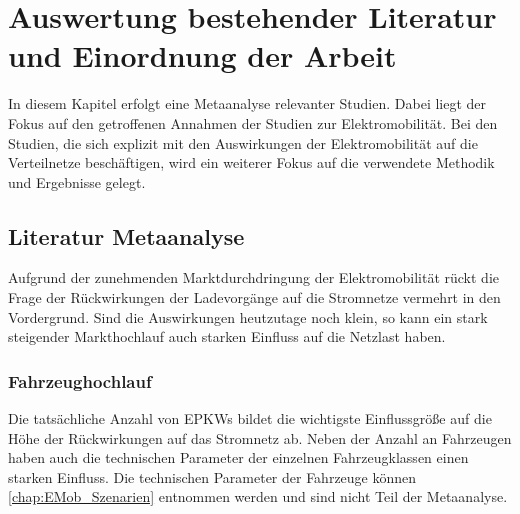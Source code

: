 
\section{Auswertung bestehender Literatur und Einordnung der Arbeit}\label{chap:Literatur}

In diesem Kapitel erfolgt eine Metaanalyse relevanter Studien.
Dabei liegt der Fokus auf den getroffenen Annahmen der Studien zur Elektromobilität.
Bei den Studien, die sich explizit mit den Auswirkungen der Elektromobilität auf die Verteilnetze beschäftigen, wird ein weiterer Fokus auf die verwendete Methodik und Ergebnisse gelegt.


\subsection{Literatur Metaanalyse}\label{chap:Metaanalyse}

Aufgrund der zunehmenden Marktdurchdringung der Elektromobilität rückt die Frage der Rückwirkungen der Ladevorgänge auf die Stromnetze vermehrt in den Vordergrund.
Sind die Auswirkungen heutzutage noch klein, so kann ein stark steigender Markthochlauf auch starken Einfluss auf die Netzlast haben.


\subsubsection{Fahrzeughochlauf}

Die tatsächliche Anzahl von \glspl{EPKW} bildet die wichtigste Einflussgröße auf die Höhe der Rückwirkungen auf das Stromnetz ab.
Neben der Anzahl an Fahrzeugen haben auch die technischen Parameter der einzelnen Fahrzeugklassen einen starken Einfluss.
Die technischen Parameter der Fahrzeuge können \autoref{chap:EMob_Szenarien} entnommen werden und sind nicht Teil der Metaanalyse.




